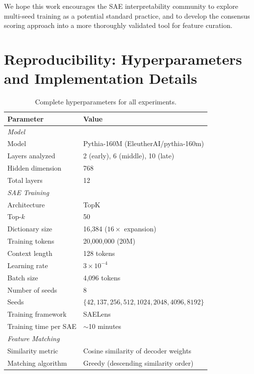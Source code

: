 \documentclass{article}
\begin{document}
We hope this work encourages the SAE interpretability community to explore multi-seed training as a potential standard practice, and to develop the consensus scoring approach into a more thoroughly validated tool for feature curation.




\appendix
\section{Reproducibility: Hyperparameters and Implementation Details}
\label{app:hyperparams}

\begin{table}[h]
\caption{Complete hyperparameters for all experiments.}
\label{tab:hyperparams}
\centering
\small
\begin{tabular}{ll}
\toprule
\textbf{Parameter} & \textbf{Value} \\
\midrule
\multicolumn{2}{l}{\emph{Model}} \\
Model & Pythia-160M (EleutherAI/pythia-160m) \\
Layers analyzed & 2 (early), 6 (middle), 10 (late) \\
Hidden dimension & 768 \\
Total layers & 12 \\
\midrule
\multicolumn{2}{l}{\emph{SAE Training}} \\
Architecture & TopK \\
Top-$k$ & 50 \\
Dictionary size & 16{,}384 ($16\times$ expansion) \\
Training tokens & 20{,}000{,}000 (20M) \\
Context length & 128 tokens \\
Learning rate & $3 \times 10^{-4}$ \\
Batch size & 4{,}096 tokens \\
Number of seeds & 8 \\
Seeds & $\{42, 137, 256, 512, 1024, 2048, 4096, 8192\}$ \\
Training framework & SAELens~\citep{bloom2024saelens} \\
Training time per SAE & $\sim$10 minutes \\
\midrule
\multicolumn{2}{l}{\emph{Feature Matching}} \\
Similarity metric & Cosine similarity of decoder weights \\
Matching algorithm & Greedy (descending similarity order) \\

\end{tabular}
\end{table}
\end{document}
